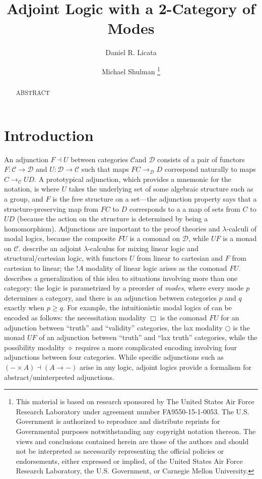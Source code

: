 \documentclass{drl-common/llncs}
\title{Adjoint Logic with a 2-Category of Modes}
\author{Daniel R. Licata\inst{1} \and Michael Shulman\inst{2}
\thanks{
This material is based on research sponsored by The United States Air
Force Research Laboratory under agreement number FA9550-15-1-0053. The
U.S. Government is authorized to reproduce and distribute reprints for
Governmental purposes notwithstanding any copyright notation thereon.
The views and conclusions contained herein are those of the authors and
should not be interpreted as necessarily representing the official
policies or endorsements, either expressed or implied, of the United
States Air Force Research Laboratory, the U.S. Government, or Carnegie
Mellon University.
}}
\institute{Wesleyan University \and University of San Diego}
\begin{document}
\maketitle

\begin{abstract}
ABSTRACT
\end{abstract}

\newcommand{\C}{\ensuremath{\mathcal{C}}}
\newcommand{\D}{\ensuremath{\mathcal{D}}}
\newcommand{\M}{\ensuremath{\mathcal{M}}}
\newcommand{\la}{\ensuremath{\dashv}}
\newcommand{\arrow}[3]{\ensuremath{#2 \longrightarrow_{#1} #3}}
\newcommand{\tc}[2]{\ensuremath{#1 \Rightarrow #2}}
\newcommand{\sh}{\text{\textesh}}
\newcommand{\Adj}{\textbf{Adj}}

\section{Introduction}

An adjunction $F \la U$ between categories \C and \D\/ consists of a
pair of functors $F : \C \to \D$ and $U : \D \to \C$ such that maps
\arrow{\D}{F C}{D} correspond naturally to maps \arrow{\C}{C}{U D}.  A
prototypical adjunction, which provides a mnemonic for the notation, is
where $U$ takes the underlying set of some algebraic structure such as a
group, and $F$ is the free structure on a set---the adjunction property
says that a structure-preserving map from $F C$ to $D$ corresponds to a
a map of sets from $C$ to $U D$ (because the action on the structure is
determined by being a homomorphism).  Adjunctions are important to the
proof theories and $\lambda$-calculi of modal logics, because the
composite $FU$ is a comonad on \D, while $UF$ is a monad on $\C$.
\citet{bentonwadler96adjoint} describe an adjoint $\lambda$-calculus for
mixing linear logic and structural/cartesian logic, with functors $U$
from linear to cartesian and $F$ from cartesian to linear; the $! A$
modality of linear logic arises as the comonad $FU$.
\citet{reed09adjoint} describes a generalization of this idea to
situations involving more than one category: the logic is parametrized
by a preorder of \emph{modes}, where every mode $p$ determines a
category, and there is an adjunction between categories $p$ and $q$
exactly when $p \ge q$.  For example, the intuitionistic modal logics of
\citet{pfenningdavies} can be encoded as follows: the necessitation
modality $\Box$ is the comonad $FU$ for an adjunction between ``truth''
and ``validity'' categories, the lax modality $\bigcirc$ is the monad
$UF$ of an adjunction between ``truth'' and ``lax truth'' categories,
while the possibility modality $\diamond$ requires a more complicated
encoding involving four adjunctions between four categories.  While
specific adjunctions such as $(- \times A) \la (A \to -)$ arise in any
logic, adjoint logics provide a formalism for abstract/uninterpreted
adjunctions.
\end{document}
